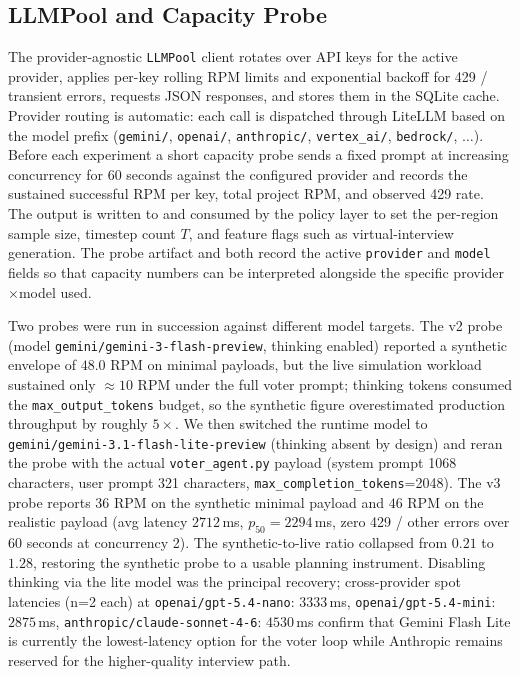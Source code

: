 \documentclass[11pt]{article}
\begin{document}
\subsection{LLMPool and Capacity Probe}
\label{app:capacity}

The provider-agnostic \texttt{LLMPool} client rotates over API keys for the active provider, applies per-key rolling RPM limits and exponential backoff for 429 / transient errors, requests JSON responses, and stores them in the SQLite cache. Provider routing is automatic: each call is dispatched through LiteLLM based on the model prefix (\texttt{gemini/}, \texttt{openai/}, \texttt{anthropic/}, \texttt{vertex\_ai/}, \texttt{bedrock/}, $\dots$). Before each experiment a short capacity probe sends a fixed prompt at increasing concurrency for 60 seconds against the configured provider and records the sustained successful RPM per key, total project RPM, and observed 429 rate. The output is written to  and consumed by the policy layer to set the per-region sample size, timestep count $T$, and feature flags such as virtual-interview generation. The probe artifact and  both record the active \texttt{provider} and \texttt{model} fields so that capacity numbers can be interpreted alongside the specific provider$\times$model used.

Two probes were run in succession against different model targets. The v2 probe (model \texttt{gemini/gemini-3-flash-preview}, thinking enabled) reported a synthetic envelope of $48.0$ RPM on minimal payloads, but the live simulation workload sustained only $\approx 10$ RPM under the full voter prompt; thinking tokens consumed the \texttt{max\_output\_tokens} budget, so the synthetic figure overestimated production throughput by roughly $5\times$. We then switched the runtime model to \texttt{gemini/gemini-3.1-flash-lite-preview} (thinking absent by design) and reran the probe with the actual \texttt{voter\_agent.py} payload (system prompt 1068 characters, user prompt 321 characters, \texttt{max\_completion\_tokens}=2048). The v3 probe reports $36$ RPM on the synthetic minimal payload and $46$ RPM on the realistic payload (avg latency $2712$\,ms, $p_{50}=2294$\,ms, zero 429 / other errors over 60 seconds at concurrency 2). The synthetic-to-live ratio collapsed from $0.21$ to $1.28$, restoring the synthetic probe to a usable planning instrument. Disabling thinking via the lite model was the principal recovery; cross-provider spot latencies (n=2 each) at \texttt{openai/gpt-5.4-nano}: $3333$\,ms, \texttt{openai/gpt-5.4-mini}: $2875$\,ms, \texttt{anthropic/claude-sonnet-4-6}: $4530$\,ms confirm that Gemini Flash Lite is currently the lowest-latency option for the voter loop while Anthropic remains reserved for the higher-quality interview path.
\end{document}
